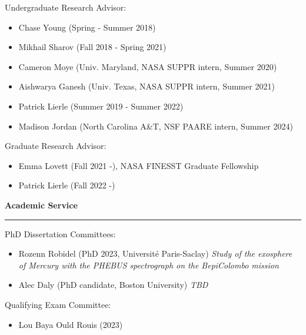 \documentclass[12pt]{report}
\begin{document}
\noindent Undergraduate Research Advisor: 
\begin{itemize} \itemsep -2pt 
	\item Chase Young (Spring - Summer 2018)
	\item Mikhail Sharov (Fall 2018 - Spring 2021)
	\item Cameron Moye (Univ. Maryland, NASA SUPPR intern, Summer 2020)
	\item Aishwarya Ganesh (Univ. Texas, NASA SUPPR intern, Summer 2021)
	\item Patrick Lierle (Summer 2019 - Summer 2022)
	\item Madison Jordan (North Carolina A\&T, NSF PAARE intern, Summer 2024)
\end{itemize}
\noindent Graduate Research Advisor: 
\begin{itemize} \itemsep -2pt
	\item Emma Lovett (Fall 2021 -), NASA FINESST Graduate Fellowship
	\item Patrick Lierle (Fall 2022 -) 
\end{itemize}

\vspace{2 mm}
\noindent \bf{Academic Service}\rm \hspace*{\fill} \\
\rule{\textwidth}{1pt}

\noindent PhD Dissertation Committees:
\begin{itemize} \itemsep -2pt
	\item Rozenn Robidel (PhD 2023, Université Paris-Saclay) \textit{Study of the exosphere of Mercury with the PHEBUS spectrograph on the BepiColombo mission}
	\item Alec Daly (PhD candidate, Boston University) \textit{TBD}
\end{itemize}

\noindent Qualifying Exam Committee:
\begin{itemize} \itemsep -2pt
	\item Lou Baya Ould Rouis (2023)
\end{itemize}
\end{document}
